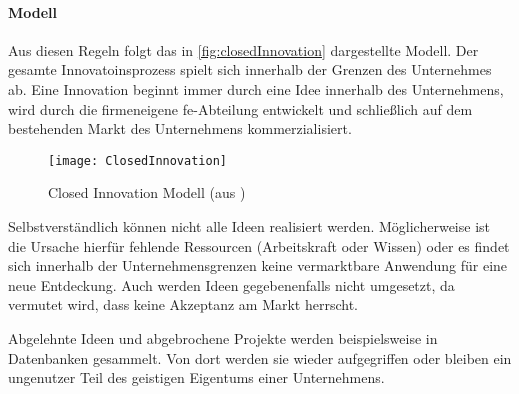 \paragraph{Modell}
Aus diesen Regeln folgt das in \autoref{fig:closedInnovation} dargestellte Modell.
Der gesamte Innovatoinsprozess spielt sich innerhalb der Grenzen des Unternehmes ab.
Eine Innovation beginnt immer durch eine Idee innerhalb des Unternehmens,
wird durch die firmeneigene \ac{fe}-Abteilung entwickelt
und schließlich auf dem bestehenden Markt des Unternehmens kommerzialisiert.

\begin{figure}[ht!]
    \centering
    \texttt{[image: ClosedInnovation]}
    \caption{Closed Innovation Modell (aus \cite[20]{herzog2011})}
    \label{fig:closedInnovation}
\end{figure}

Selbstverständlich können nicht alle Ideen realisiert werden.
Möglicherweise ist die Ursache hierfür fehlende Ressourcen (Arbeitskraft oder Wissen)
oder es findet sich innerhalb der Unternehmensgrenzen keine vermarktbare Anwendung für eine neue Entdeckung.
Auch werden Ideen gegebenenfalls nicht umgesetzt, da vermutet wird, dass keine Akzeptanz am Markt herrscht.

Abgelehnte Ideen und abgebrochene Projekte werden beispielsweise in Datenbanken gesammelt.
Von dort werden sie wieder aufgegriffen oder bleiben ein ungenutzer Teil des geistigen Eigentums einer Unternehmens.


